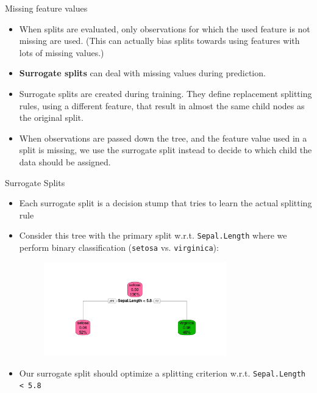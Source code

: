 \documentclass[11pt,compress,t,notes=noshow, xcolor=table]{beamer}
\begin{document}
\begin{vbframe}{Missing feature values}
  \begin{itemize}
    \item When splits are evaluated, only observations for which the used feature is not missing are used. (This can actually bias splits towards using features with lots of missing values.)
  \item \textbf{Surrogate splits} can deal with missing values during prediction.
  \item Surrogate splits are created during training. They define replacement splitting rules, using a different feature, that result in almost the same child nodes as the original split.
   \item When observations are passed down the tree, %
   and the feature value used in a split is missing, we use the surrogate split instead to decide to which child the data should be assigned.
  \end{itemize}
\end{vbframe}

\begin{vbframe}{Surrogate Splits}
\begin{itemize}
\item Each surrogate split is a decision stump that tries to learn the actual splitting rule
\item Consider this tree with the primary split w.r.t. \texttt{Sepal.Length} where we perform binary classification (\texttt{setosa} vs. \texttt{virginica}):
\begin{figure}
\includegraphics[width=0.75\textwidth]{figure/tree-binary.pdf}
\end{figure}
\item Our surrogate split should optimize a splitting criterion w.r.t. \texttt{Sepal.Length < 5.8}
\end{itemize}



\end{vbframe}
\end{document}

